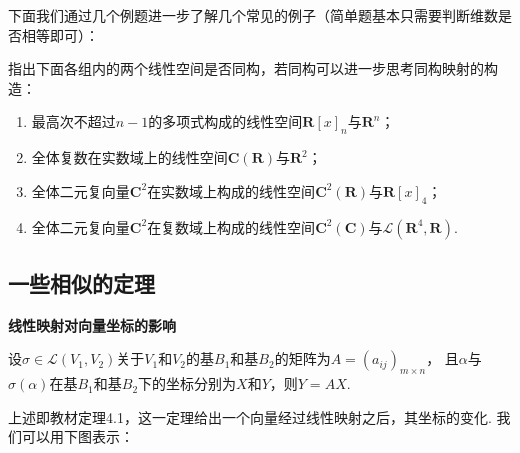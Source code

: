 下面我们通过几个例题进一步了解几个常见的例子（简单题基本只需要判断维数是否相等即可）：
\begin{example}
    指出下面各组内的两个线性空间是否同构，若同构可以进一步思考同构映射的构造：
    \begin{enumerate}
        \item 最高次不超过$n-1$的多项式构成的线性空间$\mathbf{R}[x]_n$与$\mathbf{R}^n$；

        \item 全体复数在实数域上的线性空间$\mathbf{C}(\mathbf{R})$与$\mathbf{R}^2$；

        \item 全体二元复向量$\mathbf{C}^2$在实数域上构成的线性空间$\mathbf{C}^2(\mathbf{R})$与$\mathbf{R}[x]_4$；

        \item 全体二元复向量$\mathbf{C}^2$在复数域上构成的线性空间$\mathbf{C}^2(\mathbf{C})$与$\mathcal{L}(\mathbf{R}^4,\mathbf{R})$.
    \end{enumerate}
\end{example}

\subsection{一些相似的定理}
\begin{theorem} \label{thm:6:线性映射对向量坐标的影响}
    \textbf{\heiti 线性映射对向量坐标的影响}

    设$\sigma \in \mathcal{L}(V_1,V_2)$关于$V_1$和$V_2$的基$B_1$和基$B_2$的矩阵为$A=(a_{ij})_{m \times n}$，
    且$\alpha$与$\sigma(\alpha)$在基$B_1$和基$B_2$下的坐标分别为$X$和$Y$，则$Y=AX$.
\end{theorem}
上述即教材定理4.1，这一定理给出一个向量经过线性映射之后，其坐标的变化. 我们可以用下图表示：

\begin{figure}[h]
    \centering
\end{figure}

